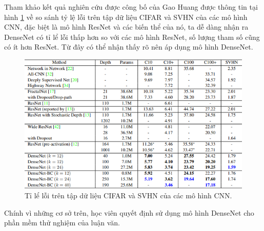 Tham khảo kết quả nghiên cứu được công bố của Gao Huang \cite{densenet} được thông tin tại hình \ref{fig:selected_model} về so sánh tỷ lệ lỗi trên tập dữ liệu CIFAR và SVHN của các mô hình CNN, đặc biệt là mô hình ResNet và các biến thể của nó, ta dễ dàng nhận ra DenseNet có tỉ lể lỗi thấp hơn so với các mô hình ResNet, số lượng tham số cũng có ít hơn ResNet. Từ đây có thể nhận thấy rõ nên áp dụng mô hình DenseNet.
\begin{figure}[H]
	\centering
	\includegraphics[width=1\linewidth]{images/selected_model}
	\caption{Tỉ lể lỗi trên tập dữ liệu CIFAR và SVHN của các mô hình CNN.}
	\label{fig:selected_model}
\end{figure}

Chính vì những cơ sở trên, học viên quyết định sử dụng mô hình DenseNet cho phần mềm thử nghiệm của luận văn.

